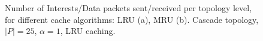 \begin{figure}[h!]
    \centering



    \cprotect\caption{Number of Interests\slash Data packets sent\slash received 
        per topology level, for different cache algorithms: LRU (a), MRU (b). 
        Cascade topology, $|P| = 25$, $\alpha = 1$, LRU caching.}
    \label{fig:exp-results-topologies-cascade}

\end{figure}

